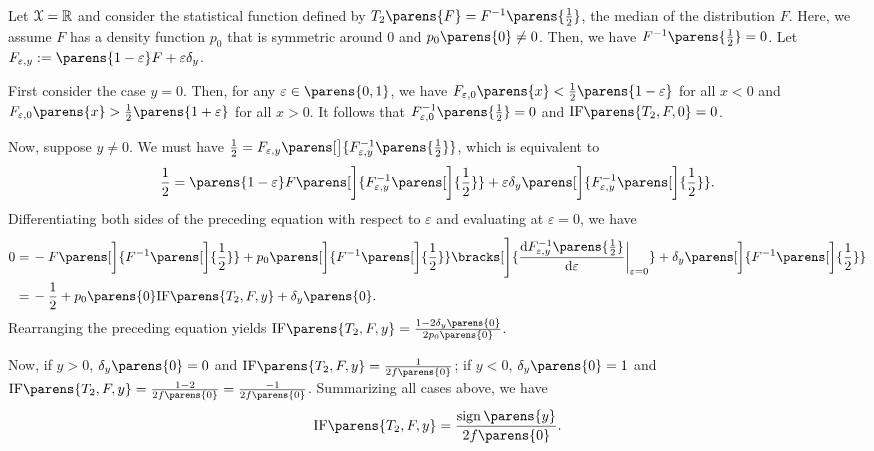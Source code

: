 \begin{example}[Median]\label{example-inf-fun-median}
	Let $\mathcal{X} = \mathbb{R}$ and consider the statistical function defined by $T_2 \parens{F} = F^{-1} \parens{\frac{1}{2}}$, the median of the distribution $F$. Here, we assume $F$ has a density function $p_0$ that is symmetric around 0 and $p_0 \parens{0} \neq 0$. Then, we have $F^{-1} \parens{\frac{1}{2}} = 0$. Let $F_{\varepsilon, y} := \parens{1 - \varepsilon} F + \varepsilon \delta_y$. 
	
	First consider the case $y = 0$. Then, for any $\varepsilon \in \parens{0, 1}$, we have $F_{\varepsilon, 0} \parens{x} < \frac{1}{2} \parens{1-\varepsilon}$ for all $x < 0$ and $F_{\varepsilon, 0} \parens{x} > \frac{1}{2} \parens{1 + \varepsilon}$ for all $x > 0$. It follows that $F_{\varepsilon, 0}^{-1} \parens{\frac{1}{2}} = 0$ and $\mathrm{IF} \parens{T_2, F, 0} = 0$. 
	
	Now, suppose $y \neq 0$. We must have $\frac{1}{2} = F_{\varepsilon, y} \parens[\big]{F_{\varepsilon, y}^{-1} \parens{\frac{1}{2}}}$, which is equivalent to 
	\begin{align*}
		\frac{1}{2} = \parens{1 - \varepsilon} F \parens[\bigg]{ F_{\varepsilon, y}^{-1} \parens[\bigg]{\frac{1}{2}}} + \varepsilon \delta_y \parens[\bigg]{ F_{\varepsilon, y}^{-1} \parens[\bigg]{\frac{1}{2}}}. 
	\end{align*}
	Differentiating both sides of the preceding equation with respect to $\varepsilon$ and evaluating at $\varepsilon = 0$, we have 
	\begin{align*}
		0 = & \, - F \parens[\bigg]{ F^{-1} \parens[\bigg]{\frac{1}{2}}} + p_0 \parens[\bigg]{ F^{-1} \parens[\bigg]{\frac{1}{2}}} \bracks[\Bigg]{\frac{\diff F_{\varepsilon, y}^{-1} \parens{\frac{1}{2}}}{\diff \varepsilon} \bigg\vert_{\varepsilon = 0}} + \delta_y \parens[\bigg]{ F^{-1} \parens[\bigg]{\frac{1}{2}}} \\ 
		= & \, - \frac{1}{2} + p_0 \parens{0} \mathrm{IF} \parens{T_2, F, y} + \delta_y \parens{0}. 
	\end{align*}
	Rearranging the preceding equation yields $\mathrm{IF} \parens{T_2, F, y} = \frac{1 - 2 \delta_y \parens{0}}{2 p_0 \parens{0}}$. 
	
	Now, if $y > 0$, $\delta_y \parens{0} = 0$ and $\mathrm{IF} \parens{T_2, F, y} = \frac{1}{2 f \parens{0}}$; if $y < 0$, $\delta_y \parens{0} = 1$ and $\mathrm{IF} \parens{T_2, F, y} = \frac{1 - 2}{2 f \parens{0}} = \frac{-1}{2 f \parens{0}}$. Summarizing all cases above, we have 
	\begin{align}\label{eq-inf-fun-median}
		\mathrm{IF} \parens{T_2, F, y} = \frac{\sign \parens{y}}{2 f \parens{0}}. 
	\end{align}
\end{example}


